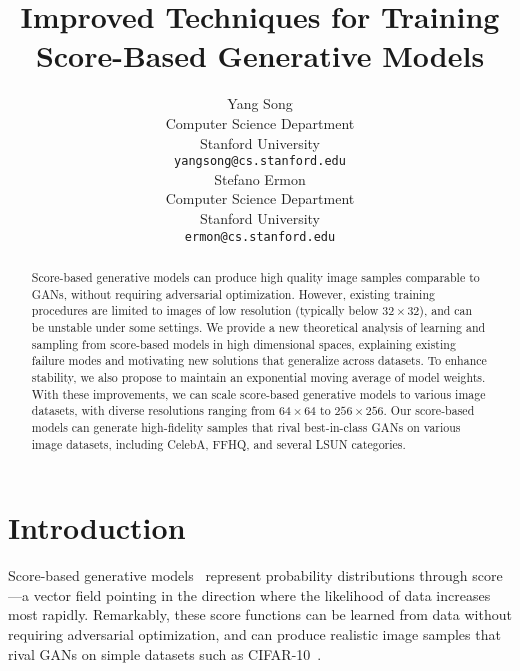 \documentclass{article}
\title{Improved Techniques for Training Score-Based Generative Models}
\author{Yang Song \\
  Computer Science Department\\
  Stanford University \\
  \texttt{yangsong@cs.stanford.edu} \\
  \And
  Stefano Ermon\\
  Computer Science Department\\
  Stanford University\\
  \texttt{ermon@cs.stanford.edu}
}
\begin{document}
\maketitle
\begin{abstract}
Score-based generative models can produce high quality image samples comparable to GANs, without requiring adversarial optimization. However, existing training procedures are limited to images of low resolution (typically below $32\times 32$), and can be unstable under some settings. We provide a new theoretical analysis of learning and sampling from score-based models in high dimensional spaces, explaining existing failure modes and motivating new solutions that generalize across datasets. 
To enhance stability, we also propose to maintain an exponential moving average of model weights. With these improvements, we can scale score-based generative models to various image datasets, with diverse resolutions ranging from $64 \times 64$ to $25 6 \times 256$. Our score-based models can generate high-fidelity samples that rival best-in-class GANs on various image datasets, including CelebA, FFHQ, and several LSUN categories.





\end{abstract} \section{Introduction}




Score-based generative models~\cite{song2019generative} represent probability distributions through score---a vector field pointing in the direction where the likelihood of data increases most rapidly. 
Remarkably, these score functions can be learned from data without requiring adversarial optimization, and can produce realistic image samples that rival GANs on simple datasets such as CIFAR-10~\cite{krizhevsky2009learning}. 
\end{document}
